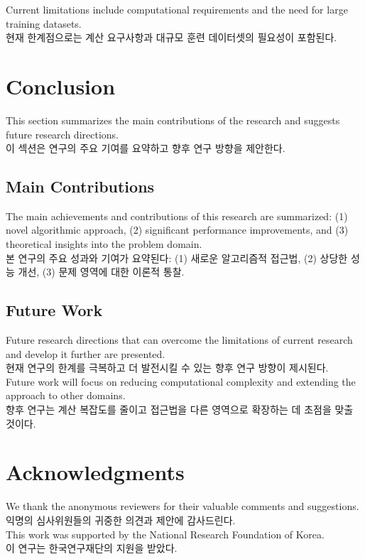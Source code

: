 \documentclass[preprint,12pt]{elsarticle}
\begin{document}
Current limitations include computational requirements and the need for large training datasets. \\
현재 한계점으로는 계산 요구사항과 대규모 훈련 데이터셋의 필요성이 포함된다. \\

\section{Conclusion}
\label{sec:conclusion}

This section summarizes the main contributions of the research and suggests future research directions. \\
이 섹션은 연구의 주요 기여를 요약하고 향후 연구 방향을 제안한다. \\

\subsection{Main Contributions}
The main achievements and contributions of this research are summarized: (1) novel algorithmic approach, (2) significant performance improvements, and (3) theoretical insights into the problem domain. \\
본 연구의 주요 성과와 기여가 요약된다: (1) 새로운 알고리즘적 접근법, (2) 상당한 성능 개선, (3) 문제 영역에 대한 이론적 통찰. \\

\subsection{Future Work}
Future research directions that can overcome the limitations of current research and develop it further are presented. \\
현재 연구의 한계를 극복하고 더 발전시킬 수 있는 향후 연구 방향이 제시된다. \\

Future work will focus on reducing computational complexity and extending the approach to other domains. \\
향후 연구는 계산 복잡도를 줄이고 접근법을 다른 영역으로 확장하는 데 초점을 맞출 것이다. \\

\section*{Acknowledgments}
We thank the anonymous reviewers for their valuable comments and suggestions. \\
익명의 심사위원들의 귀중한 의견과 제안에 감사드린다. \\

This work was supported by the National Research Foundation of Korea. \\
이 연구는 한국연구재단의 지원을 받았다. \\



\end{document}
